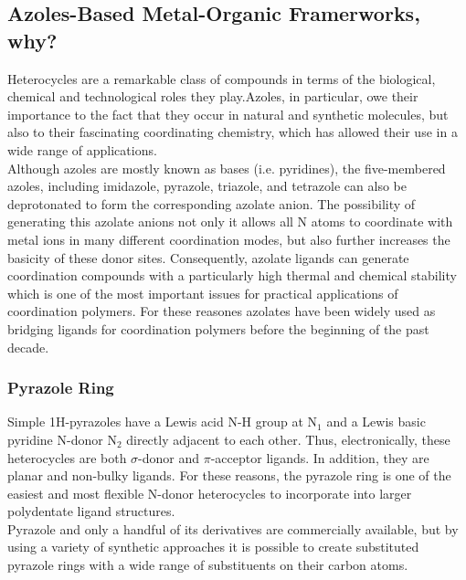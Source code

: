 \documentclass[../Master.tex]{subfiles}
\begin{document}
\subsection{Azoles-Based Metal-Organic Framerworks, why?}
Heterocycles are a remarkable class of compounds in terms of the biological, chemical and technological roles they play.Azoles, in particular, owe their importance to the fact that they occur in natural and synthetic molecules, but also to their fascinating coordinating chemistry, which has allowed their use in a wide range of applications. \\
Although azoles are mostly known as bases (i.e. pyridines), the five-membered azoles, including imidazole, pyrazole, triazole, and tetrazole can also be deprotonated to form the corresponding azolate anion. The possibility of generating this azolate anions not only it allows all N atoms to coordinate with metal ions in many different coordination modes, but also further increases the basicity of these donor sites. Consequently, azolate ligands can generate coordination compounds with a particularly high thermal and chemical stability  which is one of the most important issues for practical applications of coordination polymers.
For these reasones azolates have been widely used as bridging ligands for coordination polymers before the beginning of the past decade.
\subsubsection{Pyrazole Ring}
Simple 1H-pyrazoles have a Lewis acid N-H group at N$_1$ and a Lewis basic pyridine N-donor N$_2$ directly adjacent to each other. Thus, electronically, these heterocycles are both $\sigma$-donor and $\pi$-acceptor ligands. In addition, they are planar and non-bulky ligands. For these reasons, the pyrazole ring is one of the easiest and most flexible N-donor heterocycles to incorporate into larger polydentate ligand structures. \\
Pyrazole and only a handful of its derivatives are commercially available, but by using a variety of synthetic approaches it is possible to create substituted pyrazole rings with a wide range of substituents on their carbon atoms.
\end{document}
